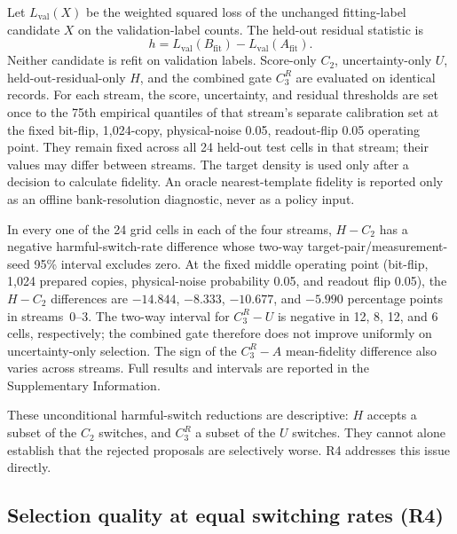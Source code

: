 \documentclass{iopjournal}
\begin{document}
Let $L_{\mathrm{val}}(X)$ be the weighted squared loss of the unchanged
fitting-label candidate $X$ on the validation-label counts.  The held-out
residual statistic is
\begin{equation}
h=L_{\mathrm{val}}(B_{\mathrm{fit}})-L_{\mathrm{val}}(A_{\mathrm{fit}}).
\end{equation}
Neither candidate is refit on validation labels.  Score-only $C_2$,
uncertainty-only $U$, held-out-residual-only $H$, and the combined gate $C_3^R$
are evaluated on identical records.  For each stream, the score, uncertainty,
and residual thresholds are set once to the 75th empirical quantiles of that
stream's separate calibration set at the fixed bit-flip, 1,024-copy,
physical-noise 0.05, readout-flip 0.05 operating point.  They remain fixed
across all 24 held-out test cells in that stream; their values may differ
between streams.  The target density is used only after a decision to calculate
fidelity.  An oracle nearest-template fidelity is reported only as an offline
bank-resolution
diagnostic, never as a policy input.

In every one of the 24 grid cells in each of the four streams, $H-C_2$ has a
negative harmful-switch-rate difference whose two-way target-pair/measurement-
seed 95\% interval excludes zero.  At the fixed middle operating point
(bit-flip, 1,024 prepared copies, physical-noise probability 0.05, and readout
flip 0.05), the $H-C_2$ differences are $-14.844$, $-8.333$, $-10.677$, and
$-5.990$ percentage points in streams~0--3.  The two-way interval for
$C_3^R-U$ is negative in 12, 8, 12, and 6 cells, respectively; the combined
gate therefore does not improve uniformly on uncertainty-only selection.  The
sign of the $C_3^R-A$ mean-fidelity difference also varies across streams.
Full results and intervals are
reported in the Supplementary Information.

These unconditional harmful-switch reductions are descriptive: $H$ accepts a
subset of the $C_2$ switches, and $C_3^R$ a subset of the $U$ switches.  They
cannot alone establish that the rejected proposals are selectively worse.
R4 addresses this issue directly.

\subsection{Selection quality at equal switching rates (R4)}
\label{subsec:r4}
\end{document}
